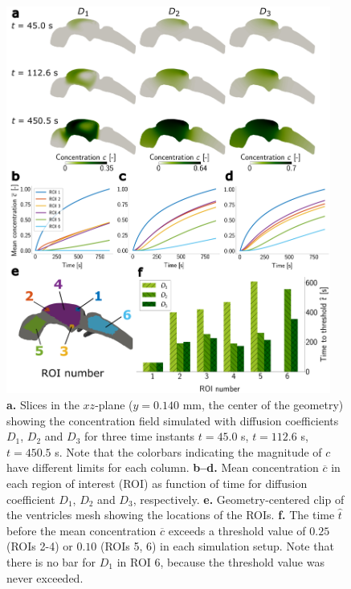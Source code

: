\documentclass[fleqn]{wlscirep}
\begin{document}
\begin{figure}[H]
    \centering
    \includegraphics[width=0.95\textwidth]{graphics/figure2_simulation_results_different_coeffs.png}
    \caption{\textbf{a.} Slices in the $xz$-plane ($y=0.140$ mm, the center of the geometry) showing the concentration field simulated with diffusion coefficients $D_1$, $D_2$ and $D_3$ for three time instants $t=45.0$ s, $t=112.6$ s, $t=450.5$ s. Note that the colorbars indicating the magnitude of $c$ have different limits for each column. \textbf{b--d.} Mean concentration $\overline{c}$ in each region of interest (ROI) as function of time for diffusion coefficient $D_1$, $D_2$ and $D_3$, respectively. \textbf{e.} Geometry-centered clip of the ventricles mesh showing the locations of the ROIs. \textbf{f.} The time $\hat{t}$ before the mean concentration $\overline{c}$ exceeds a threshold value of $0.25$ (ROIs 2-4) or $0.10$ (ROIs 5, 6) in each simulation setup. Note that there is no bar for $D_1$ in ROI 6, because the threshold value was never exceeded.}
    \label{fig:figure2_compare_diffusion_coefficients}
\end{figure}
\end{document}
